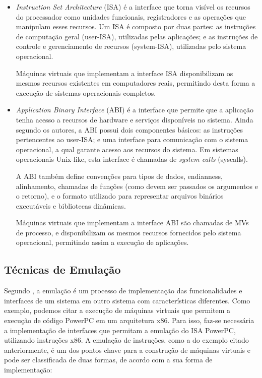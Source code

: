 \documentclass[11pt,twoside]{article}
\begin{document}
\begin{itemize}
 \item \emph{Instruction Set Architecture} (ISA) é a interface que torna visível os recursos do processador como unidades funcionais, registradores e as operações que manipulam esses recursos.    
Um ISA é composto por duas partes: as instruções de computação geral (user-ISA), utilizadas pelas aplicações; e as instruções de controle e gerenciamento de recursos (system-ISA), utilizadas pelo sistema operacional.

Máquinas virtuais que implementam a interface ISA disponibilizam os mesmos recursos existentes em computadores reais, permitindo desta forma a execução de sistemas operacionais completos. 

 \item \emph{Application Binary Interface} (ABI) é a interface que permite que a aplicação tenha acesso a recursos de hardware e serviços disponíveis no sistema\cite{Smith2005a}. 
Ainda segundo os autores, a ABI possui dois componentes básicos: as instruções pertencentes ao user-ISA; e uma interface para comunicação com o sistema operacional, a qual garante acesso aos recursos do sistema. Em sistemas operacionais Unix-like, esta interface é chamadas de \emph{system calls} (syscalls). 

A ABI também define convenções para tipos de dados, endianness, alinhamento, chamadas de funções (como devem ser passados os argumentos e o retorno), e o formato utilizado para representar arquivos binários executáveis e bibliotecas dinâmicas.

Máquinas virtuais que implementam a interface ABI são chamadas de MVs de processo, e disponibilizam os mesmos recursos fornecidos pelo sistema operacional, permitindo assim a execução de aplicações.
\end{itemize}

\subsection{Técnicas de Emulação}
\label{emulacao}
Segundo \cite{Smith2005}, a emulação é um processo de implementação das funcionalidades e interfaces de um sistema em outro sistema com características diferentes. 
Como exemplo, podemos citar a execução de máquinas virtuais que permitem a execução de código PowerPC em um arquitetura x86. 
Para isso, faz-se necessária a implementação de interfaces que permitam a emulação do ISA PowerPC, utilizando instruções x86.
A emulação de instruções, como a do exemplo citado anteriormente, é um dos pontos chave para a construção de máquinas virtuais e pode ser classificada de duas formas, de acordo com a sua forma de implementação:
\end{document}

